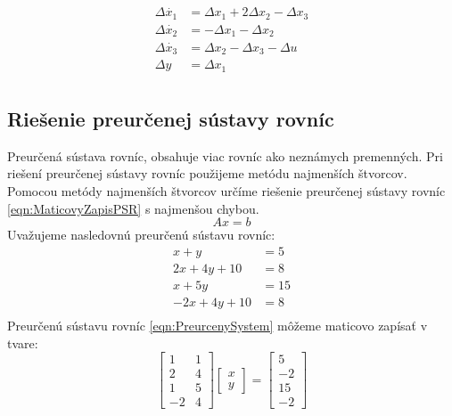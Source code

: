 \documentclass[../main.tex]{subfiles}
\begin{document}
\begin{equation}
		\begin{aligned}
		\Delta{\dot{x_1}} &= \Delta{x_1} + 2\Delta{x_2} - \Delta{x_3}			\\
		\Delta{\dot{x_2}} &= -\Delta{x_1} - \Delta{x_2} \\
		\Delta{\dot{x_3}} &= \Delta{x_2} - \Delta{x_3} - \Delta{u}		\\
		\Delta{y} &= \Delta{x_1}			\\
		\end{aligned}
		\label{eqn:matz_rovniceLinearnySystem}
\end{equation}
	
\subsection{Riešenie preurčenej sústavy rovníc}
Preurčená sústava rovníc, obsahuje viac rovníc ako neznámych premenných. Pri riešení preurčenej sústavy rovníc použijeme metódu najmenších štvorcov. Pomocou metódy najmenších štvorcov určíme riešenie preurčenej sústavy rovníc \ref{eqn:MaticovyZapisPSR} s najmenšou chybou.
\begin{equation}
    Ax = b 
	\label{eqn:MaticovyZapisPSR}
\end{equation}
Uvažujeme nasledovnú preurčenú sústavu rovníc:
\begin{equation}
	\begin{aligned}
	 x+y  & = 5 \\
	 2x+4y+10 & = 8 \\
	 x+5y & = 15 \\
	 -2x+4y+10 & = 8 \\
	\end{aligned}
	\label{eqn:PreurcenySystem}
\end{equation}
Preurčenú sústavu rovníc \ref{eqn:PreurcenySystem} môžeme maticovo zapísať v tvare:
\begin{equation}
    \begin{bmatrix} 1 & 1\\ 2 & 4 \\1 &5 \\-2& 4\end{bmatrix}\begin{bmatrix}x \\y \end{bmatrix} = \begin{bmatrix} 5 \\-2\\15\\-2 \end{bmatrix}
    \label{eqn:MaticovyZapisPiklad}
\end{equation}
\end{document}
